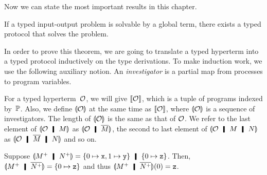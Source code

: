  Now we can state the most important results in this chapter.
\begin{theorem}
 \label{th:soundness}
 If a typed input-output problem is solvable by a global term,
 there exists a typed protocol that solves the problem.
\end{theorem}

In order to prove this theorem,
we are going to translate a typed hyperterm into a typed protocol inductively
on the type derivations.
To make induction work, we use the following auxiliary notion.
An \textit{investigator} is a partial map from processes
to program variables.

For a typed
hyperterm~$\mathcal{O}$,
we will give $\llbracket{\mathcal{O}}\rrbracket$, which is a tuple of programs indexed
by~$\mathbb{P}$.
Also, we define $\llparenthesis{\mathcal{O}}\rrparenthesis$ at the same time as
$\llbracket{\mathcal{O}}\rrbracket$, where
$\llparenthesis{\mathcal{O}}\rrparenthesis$ is a sequence of investigators.  The length of
$\llparenthesis{\mathcal{O}}\rrparenthesis$ is the same as that of $\mathcal{O}$.
We refer to the last element of $\semoi{\hypert\hmid M}$ as
$\semoi{\hypert\hmid \overline{M}}$, the second to last element of
$\semoi{\hypert\hmid M\hmid N}$ as
$\semoi{\hypert\hmid \overline M\hmid N}$ and so on.
 \begin{example}
Suppose $\semoi{\m{M}\hmid \m{N}} = \{0\mapsto \p x, 1\mapsto \p
  y\}\hmid \{0\mapsto \p z\}$.
  Then,
  $\semoi{\m{M}\hmid \overline{\m{N}}} = \{0\mapsto\p z\}$ and thus
  $\semoi{\m{M}\hmid \overline{\m{N}}}(0) = \p z$.
 \end{example}

